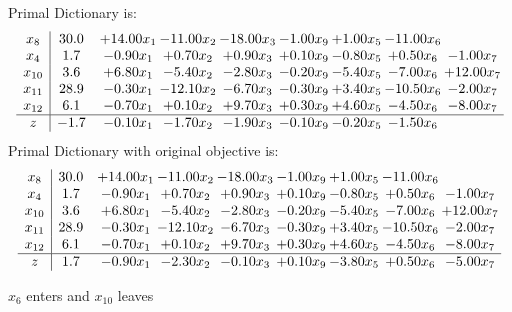 \documentclass[8pt]{article}
\begin{document}
Primal Dictionary is:
\[\begin{array}{c| c c@{\hskip 2pt} c@{\hskip 2pt} c@{\hskip 2pt} c@{\hskip 2pt} c@{\hskip 2pt} c@{\hskip 2pt} c@{\hskip 2pt} }
 x_{8}   &  30.0 & + 14.00 x_{1} & -11.00 x_{2} & -18.00 x_{3} & -1.00 x_{9} & +  1.00 x_{5} & -11.00 x_{6} &   \\
 x_{4}   &  1.7 & -0.90 x_{1} & +  0.70 x_{2} & +  0.90 x_{3} & +  0.10 x_{9} & -0.80 x_{5} & +  0.50 x_{6} & -1.00 x_{7}\\
 x_{10}   &  3.6 & +  6.80 x_{1} & -5.40 x_{2} & -2.80 x_{3} & -0.20 x_{9} & -5.40 x_{5} & -7.00 x_{6} & + 12.00 x_{7}\\
 x_{11}   &  28.9 & -0.30 x_{1} & -12.10 x_{2} & -6.70 x_{3} & -0.30 x_{9} & +  3.40 x_{5} & -10.50 x_{6} & -2.00 x_{7}\\
 x_{12}   &  6.1 & -0.70 x_{1} & +  0.10 x_{2} & +  9.70 x_{3} & +  0.30 x_{9} & +  4.60 x_{5} & -4.50 x_{6} & -8.00 x_{7}\\
\hline
z    &  -1.7 & -0.10 x_{1} & -1.70 x_{2} & -1.90 x_{3} & -0.10 x_{9} & -0.20 x_{5} & -1.50 x_{6} &   \\
\end{array}\]
Primal Dictionary with original objective is:
\[\begin{array}{c| c c@{\hskip 2pt} c@{\hskip 2pt} c@{\hskip 2pt} c@{\hskip 2pt} c@{\hskip 2pt} c@{\hskip 2pt} c@{\hskip 2pt} }
 x_{8}   &  30.0 & + 14.00 x_{1} & -11.00 x_{2} & -18.00 x_{3} & -1.00 x_{9} & +  1.00 x_{5} & -11.00 x_{6} &   \\
 x_{4}   &  1.7 & -0.90 x_{1} & +  0.70 x_{2} & +  0.90 x_{3} & +  0.10 x_{9} & -0.80 x_{5} & +  0.50 x_{6} & -1.00 x_{7}\\
 x_{10}   &  3.6 & +  6.80 x_{1} & -5.40 x_{2} & -2.80 x_{3} & -0.20 x_{9} & -5.40 x_{5} & -7.00 x_{6} & + 12.00 x_{7}\\
 x_{11}   &  28.9 & -0.30 x_{1} & -12.10 x_{2} & -6.70 x_{3} & -0.30 x_{9} & +  3.40 x_{5} & -10.50 x_{6} & -2.00 x_{7}\\
 x_{12}   &  6.1 & -0.70 x_{1} & +  0.10 x_{2} & +  9.70 x_{3} & +  0.30 x_{9} & +  4.60 x_{5} & -4.50 x_{6} & -8.00 x_{7}\\
\hline
z    &  1.7 & -0.90 x_{1} & -2.30 x_{2} & -0.10 x_{3} & +  0.10 x_{9} & -3.80 x_{5} & +  0.50 x_{6} & -5.00 x_{7}\\
\end{array}\]


 $ x_{6} $ enters and $ x_{10} $ leaves 
\end{document}
